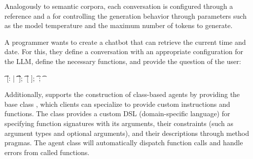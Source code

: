 Analogously to semantic corpora, each conversation is configured through a  reference and a  for controlling the generation behavior through parameters such as the model temperature and the maximum number of tokens to generate.

\begin{example}
	A programmer wants to create a chatbot that can retrieve the current time and date.
	For this, they define a conversation with an appropriate configuration for the LLM, define the necessary functions, and provide the question of the user:

	\begin{multicode}
		  \n
		\t	{} [: | \n
		\t	\t	{}  ]; \n
		\t	{}   [ ]; \n
		\t	{} ; \n
		\t	{} 
	\end{multicode}
\end{example}

Additionally, \semtex supports the construction of class-based agents by providing the base class , which clients can specialize to provide custom instructions and functions.
The  class provides a custom DSL (domain-specific language) for specifying function signatures with its arguments, their constraints (such as argument types and optional arguments), and their descriptions through method pragmas.
The agent class will automatically dispatch function calls and handle errors from called functions.

